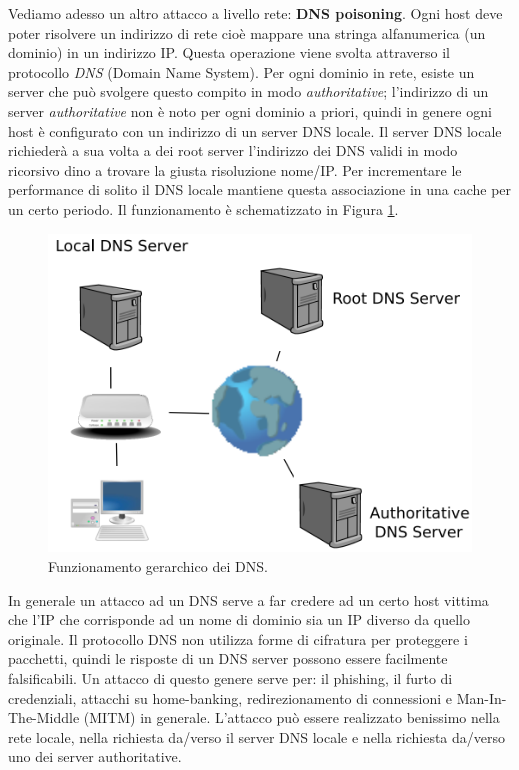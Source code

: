 Vediamo adesso un altro attacco a livello rete: \textbf{DNS poisoning}. Ogni host deve poter risolvere un indirizzo di rete cioè mappare una stringa alfanumerica (un dominio) in un indirizzo IP. Questa operazione viene svolta attraverso il protocollo \textit{DNS} (Domain Name System). Per ogni dominio in rete, esiste un server che può svolgere questo compito in modo \textit{authoritative}; l'indirizzo di un server \textit{authoritative} non è noto per ogni dominio a priori, quindi in genere ogni host è configurato con un indirizzo di un server DNS locale. Il server DNS locale richiederà a sua volta a dei root server l'indirizzo dei DNS validi in modo ricorsivo dino a trovare la giusta risoluzione nome/IP. Per incrementare le performance di solito il DNS locale mantiene questa associazione in una cache per un certo periodo. Il funzionamento è schematizzato in Figura \ref{img:DNS}.
\begin{figure}[htbp]
	\centering
	\includegraphics[scale = 0.5]{images/DNS}
	\caption{Funzionamento gerarchico dei DNS.}
	\label{img:DNS}
\end{figure}
\noindent
In generale un attacco ad un DNS serve a far credere ad un certo host vittima che l'IP che corrisponde ad un nome di dominio sia un IP diverso da quello originale. Il protocollo DNS non utilizza forme di cifratura per proteggere i pacchetti, quindi le risposte di un DNS server possono essere facilmente falsificabili. Un attacco di questo genere serve per: il phishing, il furto di credenziali, attacchi su home-banking, redirezionamento di connessioni e Man-In-The-Middle (MITM) in generale. L'attacco può essere realizzato benissimo nella rete locale, nella richiesta da/verso il server DNS locale e nella richiesta da/verso uno dei server authoritative.\\
